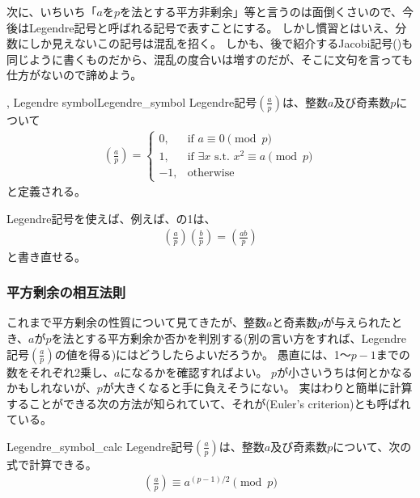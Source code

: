 次に、いちいち「$a$を$p$を法とする平方非剰余」等と言うのは面倒くさいので、今後はLegendre記号と呼ばれる記号で表すことにする。
しかし慣習とはいえ、分数にしか見えないこの記号は混乱を招く。
しかも、後で紹介するJacobi記号()も同じように書くものだから、混乱の度合いは増すのだが、そこに文句を言っても仕方がないので諦めよう。

\begin{Defi}{, Legendre symbol}{Legendre_symbol}
Legendre記号$\left(\frac{a}{p}\right)$は、整数$a$及び奇素数$p$について
\begin{align*}
\left(\frac{a}{p}\right) =
\begin{cases}
0, &\mbox{if }a \equiv 0 \pmod{p}\\
1, &\mbox{if }\exists x \mbox{ s.t. } x^2 \equiv a \pmod{p}\\
-1, &\mbox{otherwise}
\end{cases}
\end{align*}
と定義される。
\end{Defi}

Legendre記号を使えば、例えば、の1は、
\begin{align*}
\left(\frac{a}{p}\right)\left(\frac{b}{p}\right) = \left(\frac{ab}{p}\right)
\end{align*}
と書き直せる。

\subsubsection{平方剰余の相互法則}
これまで平方剰余の性質について見てきたが、整数$a$と奇素数$p$が与えられたとき、$a$が$p$を法とする平方剰余か否かを判別する(別の言い方をすれば、Legendre記号$\left(\frac{a}{p}\right)$の値を得る)にはどうしたらよいだろうか。
愚直には、1～$p-1$までの数をそれぞれ2乗し、$a$になるかを確認すればよい。
$p$が小さいうちは何とかなるかもしれないが、$p$が大きくなると手に負えそうにない。
実はわりと簡単に計算することができる次の方法が知られていて、それが(Euler's criterion)とも呼ばれている。

\begin{Prop}{}{Legendre_symbol_calc}
Legendre記号$\left(\frac{a}{p}\right)$は、整数$a$及び奇素数$p$について、次の式で計算できる。
\begin{align*}
\left(\frac{a}{p}\right) \equiv a^{(p-1)/2} \pmod{p}
\end{align*}
\end{Prop}

